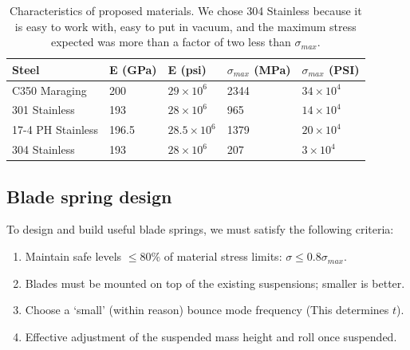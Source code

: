\begin{table}[ht]
	\centering
		\begin{tabular}{ l | l | l | l | l }
			Steel & E (GPa) & E (psi) & $\sigma_{max}$ (MPa)  & $\sigma_{max}$ (PSI) \\ \hline
			C350 Maraging & 200 & $29\times10^6$ & 2344 & $34\times10^4$ \\ \hline
			301 Stainless & 193 & $28\times10^6$ & 965 & $14\times10^4$ \\ \hline
			17-4 PH Stainless & 196.5 & $28.5\times10^6$ & 1379 & $20\times10^4$\\ \hline
			304 Stainless &  193 & $28\times10^6$ & 207 & $3\times10^4$
		\end{tabular}
	\caption{Characteristics of proposed materials. We chose 304 Stainless because it is easy to work with, easy to put in vacuum, and the maximum stress expected was more than a factor of two less than $\sigma_{max}$.}
	\label{tab:materials}
\end{table}

\subsection{Blade spring design}

To design and build useful blade springs, we must satisfy the following criteria:

\begin{enumerate}
	\item Maintain safe levels $\leq 80\%$ of material stress limits:
	$\sigma\leq0.8\sigma_{max}$.
	\item Blades must be mounted on top of the existing suspensions; smaller is better. 
  \item Choose a `small' (within reason) bounce mode frequency (This determines $t$). 
	\item Effective adjustment of the suspended mass height and roll once suspended.
	
\end{enumerate}

